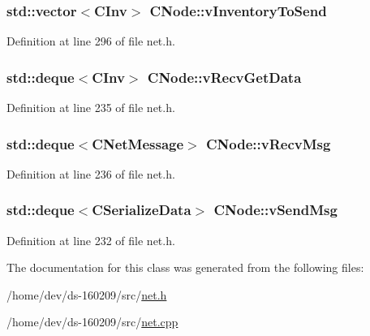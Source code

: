 \hypertarget{class_c_node_abcd24c9478bc1ab5ba6de6b369080cec}{}
\subsubsection[{v\+Inventory\+To\+Send}]{\setlength{\rightskip}{0pt plus 5cm}std\+::vector$<${\bf C\+Inv}$>$ C\+Node\+::v\+Inventory\+To\+Send}\label{class_c_node_abcd24c9478bc1ab5ba6de6b369080cec}


Definition at line 296 of file net.\+h.

\hypertarget{class_c_node_a9649c1f27ff0d8f0ba89eb1ea5bee139}{}
\subsubsection[{v\+Recv\+Get\+Data}]{\setlength{\rightskip}{0pt plus 5cm}std\+::deque$<${\bf C\+Inv}$>$ C\+Node\+::v\+Recv\+Get\+Data}\label{class_c_node_a9649c1f27ff0d8f0ba89eb1ea5bee139}


Definition at line 235 of file net.\+h.

\hypertarget{class_c_node_a015361812daa5b6ebb9a5692ddf67a54}{}
\subsubsection[{v\+Recv\+Msg}]{\setlength{\rightskip}{0pt plus 5cm}std\+::deque$<${\bf C\+Net\+Message}$>$ C\+Node\+::v\+Recv\+Msg}\label{class_c_node_a015361812daa5b6ebb9a5692ddf67a54}


Definition at line 236 of file net.\+h.

\hypertarget{class_c_node_a68e5fb1a80fe4247aa577a3c9a74b399}{}
\subsubsection[{v\+Send\+Msg}]{\setlength{\rightskip}{0pt plus 5cm}std\+::deque$<${\bf C\+Serialize\+Data}$>$ C\+Node\+::v\+Send\+Msg}\label{class_c_node_a68e5fb1a80fe4247aa577a3c9a74b399}


Definition at line 232 of file net.\+h.



The documentation for this class was generated from the following files\+:\begin{DoxyCompactItemize}
\item 
/home/dev/ds-\/160209/src/\hyperlink{net_8h}{net.\+h}\item 
/home/dev/ds-\/160209/src/\hyperlink{net_8cpp}{net.\+cpp}\end{DoxyCompactItemize}
